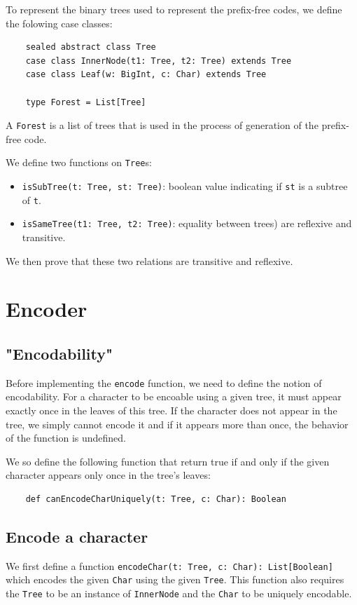 \documentclass[a4paper,UKenglish,cleveref, autoref, thm-restate]{lipics-v2021}
\begin{document}
To represent the binary trees used to represent the prefix-free codes, we define the folowing case classes:

\begin{lstlisting}
    sealed abstract class Tree
    case class InnerNode(t1: Tree, t2: Tree) extends Tree
    case class Leaf(w: BigInt, c: Char) extends Tree
  
    type Forest = List[Tree]
\end{lstlisting}

A \lstinline{Forest} is a list of trees that is used in the process of generation of the prefix-free code.

We define two functions on \lstinline{Tree}s:
\begin{itemize}
    \item \lstinline{isSubTree(t: Tree, st: Tree)}: boolean value indicating if \lstinline{st} is a subtree of \lstinline{t}.
    \item \lstinline{isSameTree(t1: Tree, t2: Tree)}: equality between trees) are reflexive and transitive.
\end{itemize}

We then prove that these two relations are transitive and reflexive.

\section{Encoder}

\subsection{"Encodability"}
Before implementing the \lstinline{encode} function, we need to define the notion of encodability. For a character to be encoable using a given tree, it must appear exactly once in the leaves of this tree. If the character does 
not appear in the tree, we simply cannot encode it and if it appears more than once, the behavior of the function is undefined.

We so define the following function that return true if and only if the given character appears only once in the tree's leaves:

\begin{lstlisting}
    def canEncodeCharUniquely(t: Tree, c: Char): Boolean
\end{lstlisting}


\subsection{Encode a character}
We first define a function \lstinline{encodeChar(t: Tree, c: Char): List[Boolean]} which encodes the given \lstinline{Char} using the given \lstinline{Tree}. This function also requires the \lstinline{Tree} to be an instance of \lstinline{InnerNode} 
and the \lstinline{Char} to be uniquely encodable.
\end{document}
